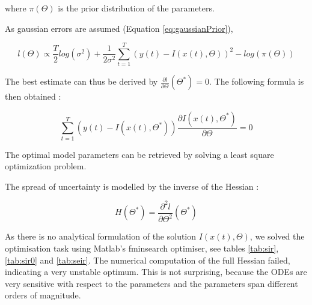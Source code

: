 \documentclass[11pt, a4paper]{article}
\begin{document}
where $\pi(\Theta)$ is the prior distribution of the parameters.

As gaussian errors are assumed (Equation \ref{eq:gaussianPrior}),

\begin{equation}
l(\Theta) \propto \frac{T}{2} log(\sigma^2) + \frac{1}{2 \sigma^2} \sum_{t=1}^T (y(t)-I(x(t), \Theta))^2 - log(\pi(\Theta))
\end{equation}

The best estimate can thus be derived by $\frac{\partial l}{\partial \Theta}(\Theta^*) = 0$. The following formula is then obtained :

\begin{equation}
\sum_{t=1}^T (y(t) - I(x(t), \Theta^*)) \frac{\partial I(x(t), \Theta^*)}{\partial \Theta} = 0
\end{equation}

The optimal model parameters can be retrieved by solving a least square optimization problem. 

The spread of uncertainty is modelled by the inverse of the Hessian :

\begin{equation}
H(\Theta^*) = \frac{\partial^2 l}{\partial \Theta^2} (\Theta^*) 
\end{equation}

As there is no analytical formulation of the solution $I(x(t), \Theta)$, we solved the optimisation task using Matlab's fminsearch optimiser, see tables \ref{tab:sir}, \ref{tab:sir0} and \ref{tab:seir}. The numerical computation of the full Hessian failed, indicating a very unstable optimum. This is not surprising, because the ODEs are very sensitive with respect to the parameters and the parameters span different orders of magnitude.
\end{document}
